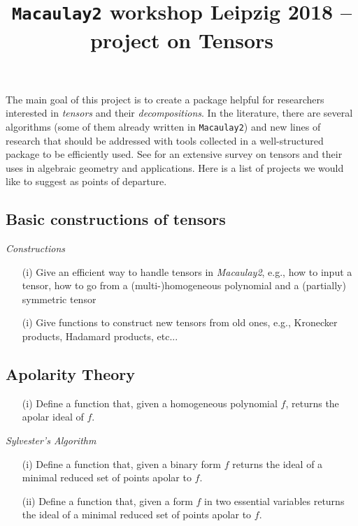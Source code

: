 \documentclass[11pt]{extarticle}
\title{{\bf \texttt{Macaulay2} workshop Leipzig 2018 -- project on Tensors}}
\theoremstyle{definition}
\theoremstyle{remark}
\theoremstyle{definition}
\begin{document}
\maketitle

The main goal of this project is to create a package helpful for researchers interested in {\it tensors} and their {\it decompositions}. In the literature, there are several algorithms (some of them already written in \texttt{Macaulay2}) and new lines of research that should be addressed with tools collected in a well-structured package to be efficiently used. See \cite{Lan12} for an extensive survey on tensors and their uses in algebraic geometry and applications. Here is a list of projects we would like to suggest as points of departure. 



%
%

\subsection*{Basic constructions of tensors}
{\it Constructions}
\begin{itemize}
\item[(i)] Give an efficient way to handle tensors in {\it Macaulay2}, e.g., how to input a tensor, how to go from a (multi-)homogeneous polynomial and a (partially) symmetric tensor
\end{itemize}

\begin{itemize}
\item[(i)] Give functions to construct new tensors from old ones, e.g., Kronecker products, Hadamard products, etc...
\end{itemize}

\subsection*{Apolarity Theory}
\begin{itemize}
	\item[(i)]  Define a function that, given a homogeneous polynomial $f$, returns the apolar ideal of $f$.
\end{itemize}
{\it Sylvester's Algorithm}
\begin{itemize}
	\item[(i)] Define a function that, given a binary form $f$ returns the ideal of a minimal reduced set of points apolar to $f$.
	\item[(ii)] Define a function that, given a form $f$ in two essential variables returns the ideal of a minimal reduced set of points apolar to $f$.
\end{itemize}
\end{document}
